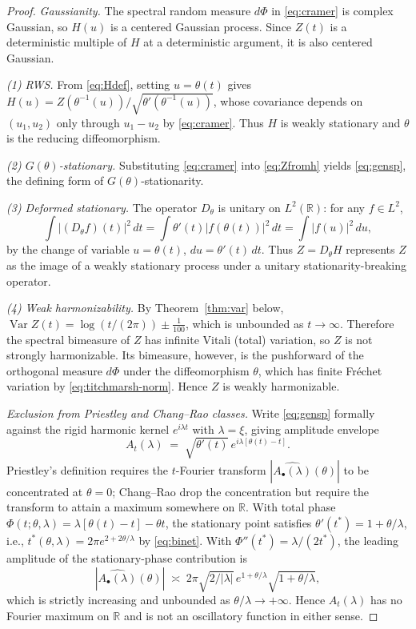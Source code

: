 \documentclass[11pt]{amsart}
\theoremstyle{definition}
\DeclareMathOperator{\Var}{Var}
\begin{document}
\begin{proof}
\emph{Gaussianity.} The spectral random measure $d\Phi$ in
\eqref{eq:cramer} is complex Gaussian, so $H(u)$ is a centered Gaussian
process. Since $Z(t)$ is a deterministic multiple of $H$ at a deterministic
argument, it is also centered Gaussian.

\emph{(1) RWS.} From \eqref{eq:Hdef}, setting $u=\theta(t)$ gives
$H(u)=Z(\theta^{-1}(u))/\sqrt{\theta'(\theta^{-1}(u))}$, whose covariance
depends on $(u_{1},u_{2})$ only through $u_{1}-u_{2}$ by \eqref{eq:cramer}.
Thus $H$ is weakly stationary and $\theta$ is the reducing diffeomorphism.

\emph{(2) $G(\theta)$-stationary.} Substituting \eqref{eq:cramer} into
\eqref{eq:Zfromh} yields \eqref{eq:gensp}, the defining form of
$G(\theta)$-stationarity.

\emph{(3) Deformed stationary.} The operator $D_{\theta}$ is unitary on
$L^{2}(\mathbb{R})$: for any $f\in L^{2}$,
\[
\int|(D_{\theta}f)(t)|^{2}\,dt
=\int\theta'(t)|f(\theta(t))|^{2}\,dt
=\int|f(u)|^{2}\,du,
\]
by the change of variable $u=\theta(t)$, $du=\theta'(t)\,dt$. Thus
$Z=D_{\theta}H$ represents $Z$ as the image of a weakly stationary
process under a unitary stationarity-breaking operator.

\emph{(4) Weak harmonizability.} By Theorem~\ref{thm:var} below,
$\Var Z(t) = \log(t/(2\pi))\pm \tfrac{1}{100}$, which is unbounded as
$t\to\infty$. Therefore the spectral bimeasure of $Z$ has infinite
Vitali (total) variation, so $Z$ is not strongly harmonizable. Its
bimeasure, however, is the pushforward of the orthogonal measure $d\Phi$
under the diffeomorphism $\theta$, which has finite Fr\'echet variation
by \eqref{eq:titchmarsh-norm}. Hence $Z$ is weakly harmonizable.

\emph{Exclusion from Priestley and Chang--Rao classes.} Write
\eqref{eq:gensp} formally against the rigid harmonic kernel $e^{i\lambda t}$
with $\lambda=\xi$, giving amplitude envelope
\[
A_{t}(\lambda) \;=\; \sqrt{\theta'(t)}\,e^{i\lambda[\theta(t)-t]}.
\]
Priestley's definition requires the $t$-Fourier transform
$|\widehat{A_{\bullet}(\lambda)}(\theta)|$ to be concentrated at $\theta=0$;
Chang--Rao drop the concentration but require the transform to attain a
maximum somewhere on $\mathbb{R}$. With total phase
$\Phi(t;\theta,\lambda)=\lambda[\theta(t)-t]-\theta t$, the stationary
point satisfies $\theta'(t^{*})=1+\theta/\lambda$, i.e.,
$t^{*}(\theta,\lambda)=2\pi e^{2+2\theta/\lambda}$ by \eqref{eq:binet}.
With $\Phi''(t^{*})=\lambda/(2t^{*})$, the leading amplitude of the
stationary-phase contribution is
\[
|\widehat{A_{\bullet}(\lambda)}(\theta)|
\;\asymp\; 2\pi\sqrt{2/|\lambda|}\,e^{1+\theta/\lambda}\sqrt{1+\theta/\lambda},
\]
which is strictly increasing and unbounded as $\theta/\lambda\to+\infty$.
Hence $A_{t}(\lambda)$ has no Fourier maximum on $\mathbb{R}$ and is
not an oscillatory function in either sense.
\end{proof}
\end{document}
